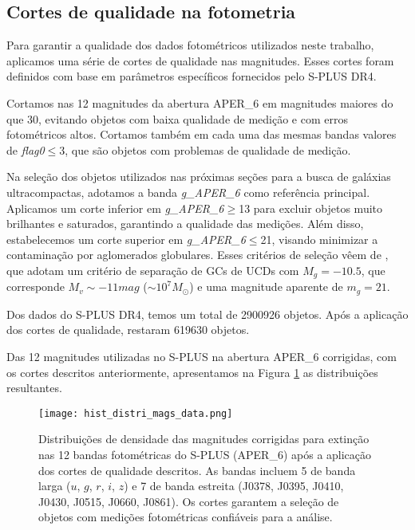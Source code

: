 \subsection{Cortes de qualidade na fotometria}\label{subsec:cuts}
Para garantir a qualidade dos dados fotométricos utilizados neste trabalho, aplicamos uma série de cortes de qualidade nas magnitudes. Esses cortes foram definidos com base em parâmetros específicos fornecidos pelo S-PLUS DR4.

Cortamos nas 12 magnitudes da abertura APER\_6 em magnitudes maiores do que 30, evitando objetos com baixa qualidade de medição e com erros fotométricos altos. Cortamos também em cada uma das mesmas bandas valores de \textit{flag0}$\leq$3, que são objetos com problemas de qualidade de medição.

Na seleção dos objetos utilizados nas próximas seções para a busca de galáxias ultracompactas, adotamos a banda \textit{g\_APER\_6} como referência principal. Aplicamos um corte inferior em \textit{g\_APER\_6}$\geq$13 para excluir objetos muito brilhantes e saturados, garantindo a qualidade das medições. Além disso, estabelecemos um corte superior em \textit{g\_APER\_6}$\leq$21, visando minimizar a contaminação por aglomerados globulares. Esses critérios de seleção vêem de \cite{Cantiello_2020}, que adotam um critério de separação de GCs de UCDs com $M_g=-10.5$, que corresponde $M_v\sim -11mag$ ($\sim10^7 M_\odot$) e uma magnitude aparente de $m_g=21$.

Dos dados do S-PLUS DR4, temos um total de 2900926 objetos. Após a aplicação dos cortes de qualidade, restaram 619630 objetos.

Das 12 magnitudes utilizadas no S-PLUS na abertura APER\_6 corrigidas, com os cortes descritos anteriormente, apresentamos na Figura \ref{fig:hist_distri_mags_data} as distribuições resultantes.

\begin{figure}[!ht]
    \begin{center}
    \texttt{[image: hist\_distri\_mags\_data.png]}
    \caption[]{Distribuições de densidade das magnitudes corrigidas para extinção nas 12 bandas fotométricas do S-PLUS (APER\_6) após a aplicação dos cortes de qualidade descritos. As bandas incluem 5 de banda larga ($u$, $g$, $r$, $i$, $z$) e 7 de banda estreita (J0378, J0395, J0410, J0430, J0515, J0660, J0861). Os cortes garantem a seleção de objetos com medições fotométricas confiáveis para a análise.}
    \label{fig:hist_distri_mags_data}
    \end{center}
\end{figure}
